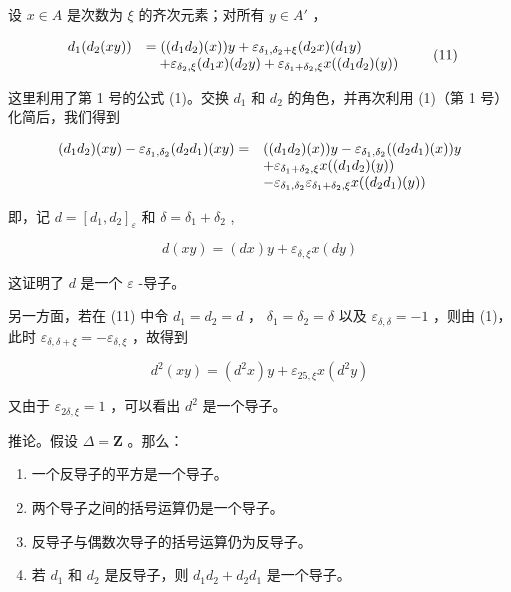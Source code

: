 设 \(x \in A\) 是次数为 \(\xi\) 的齐次元素；对所有 \(y \in A'\) ，

\[
\begin{array}{r l} d _ {1} (d _ {2} (x y)) & = ((d _ {1} d _ {2}) (x)) y + \varepsilon_ {\delta_ {1}, \delta_ {2} + \xi} (d _ {2} x) (d _ {1} y) \\ & \quad + \varepsilon_ {\delta_ {2}, \xi} (d _ {1} x) (d _ {2} y) + \varepsilon_ {\delta_ {1} + \delta_ {2}, \xi} x ((d _ {1} d _ {2}) (y)) \end{array}\tag{11}
\]

这里利用了第 1 号的公式 (1)。交换 \(d_1\) 和 \(d_2\) 的角色，并再次利用 (1)（第 1 号）化简后，我们得到

\[
\begin{array}{r l} (d _ {1} d _ {2}) (x y) - \varepsilon_ {\delta_ {1}, \delta_ {2}} (d _ {2} d _ {1}) (x y) = & ((d _ {1} d _ {2}) (x)) y - \varepsilon_ {\delta_ {1}, \delta_ {2}} ((d _ {2} d _ {1}) (x)) y \\ & + \varepsilon_ {\delta_ {1} + \delta_ {2}, \xi} x ((d _ {1} d _ {2}) (y)) \\ & - \varepsilon_ {\delta_ {1}, \delta_ {2}} \varepsilon_ {\delta_ {1} + \delta_ {2}, \xi} x ((d _ {2} d _ {1}) (y)) \end{array}
\]

即，记 \(d = [d_1, d_2]_{\varepsilon}\) 和 \(\delta = \delta_1 + \delta_2\) ,

\[
d (x y) = (d x) y + \varepsilon_ {\delta , \xi} x (d y)
\]

这证明了 \(d\) 是一个 \(\varepsilon\) -导子。

另一方面，若在 (11) 中令 \(d_1 = d_2 = d\) ， \(\delta_1 = \delta_2 = \delta\) 以及 \(\varepsilon_{\delta,\delta} = -1\) ，则由 (1)，此时 \(\varepsilon_{\delta,\delta + \xi} = -\varepsilon_{\delta,\xi}\) ，故得到

\[
d ^ {2} (x y) = \left(d ^ {2} x\right) y + \varepsilon_ {2 5, \xi} x \left(d ^ {2} y\right)
\]

又由于 \(\varepsilon_{2\delta, \xi} = 1\) ，可以看出 \(d^2\) 是一个导子。

推论。假设 \(\Delta = \mathbf{Z}\) 。那么：

\begin{enumerate}
\def\labelenumi{(\roman{enumi})}
\item
  一个反导子的平方是一个导子。
\item
  两个导子之间的括号运算仍是一个导子。
\item
  反导子与偶数次导子的括号运算仍为反导子。
\item
  若 \(d_1\) 和 \(d_2\) 是反导子，则 \(d_1d_2 + d_2d_1\) 是一个导子。
\end{enumerate}

